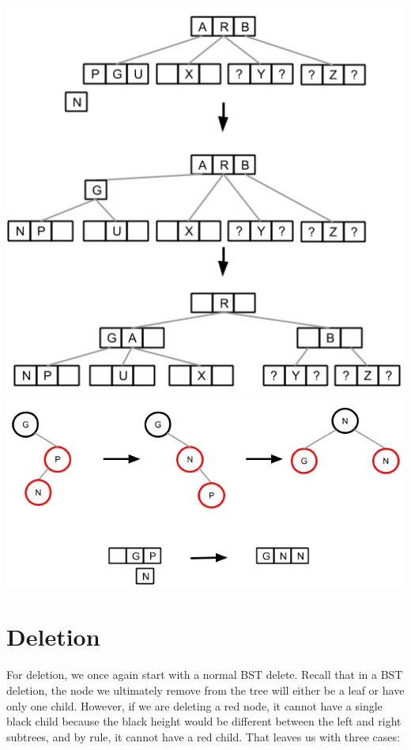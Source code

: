 \documentclass[12pt]{article}
\begin{document}
\begin{enumerate}
\begin{enumerate}
\begin{center}
      \includegraphics[scale=0.5]{pics/red_black_tree/ins_rpar_runc_234}
      \includegraphics[scale=0.55]{pics/red_black_tree/ins_rpar_bunc_rl}
    \end{center}
  \end{enumerate}
\end{enumerate}


\section*{Deletion}
For deletion, we once again start with a normal BST delete. Recall that in a BST deletion, the node we ultimately remove from the tree will either be a leaf or have only one child. However, if we are deleting a red node, it cannot have a single black child because the black height would be different between the left and right subtrees, and by rule, it cannot have a red child. That leaves us with three cases:
\end{document}
